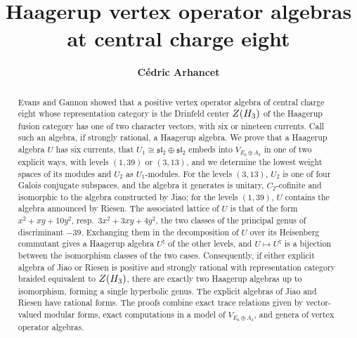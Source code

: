 \documentclass[leqno]{article}
\let\cal\relax
\newcommand{\cal}{\mathcal}
\numberwithin{equation}{section}
\begin{document}
\title{\bfseries{Haagerup vertex operator algebras at central charge eight}}
\date{}
\author{\bfseries{C\'edric Arhancet}}
\maketitle

\begin{abstract}
Evans and Gannon showed that a positive vertex operator algebra of central charge eight whose representation category is the Drinfeld center $Z(\cal H_3)$ of the Haagerup fusion category has one of two character vectors, with six or nineteen currents. Call such an algebra, if strongly rational, a Haagerup algebra. We prove that a Haagerup algebra $U$ has six currents, that $U_1 \cong \mathfrak{sl}_2 \oplus \mathfrak{sl}_2$ embeds into $V_{E_6 \oplus A_2}$ in one of two explicit ways, with levels $(1,39)$ or $(3,13)$, and we determine the lowest weight spaces of its modules and $U_2$ as $U_1$-modules. For the levels $(3,13)$, $U_2$ is one of four Galois conjugate subspaces, and the algebra it generates is unitary, $C_2$-cofinite and isomorphic to the algebra constructed by Jiao; for the levels $(1,39)$, $U$ contains the algebra announced by Riesen. The associated lattice of $U$ is that of the form $x^2+xy+10y^2$, resp.\ $3x^2+3xy+4y^2$, the two classes of the principal genus of discriminant $-39$. Exchanging them in the decomposition of $U$ over its Heisenberg commutant gives a Haagerup algebra $U^\natural$ of the other levels, and $U \mapsto U^\natural$ is a bijection between the isomorphism classes of the two cases. Consequently, if either explicit algebra of Jiao or Riesen is positive and strongly rational with representation category braided equivalent to $Z(\cal H_3)$, there are exactly two Haagerup algebras up to isomorphism, forming a single hyperbolic genus. The explicit algebras of Jiao and Riesen have rational forms. The proofs combine exact trace relations given by vector-valued modular forms, exact computations in a model of $V_{E_6 \oplus A_2}$, and genera of vertex operator algebras.
\end{abstract}

\makeatletter
 \renewcommand{\@makefntext}[1]{#1}
 \makeatother
\end{document}

